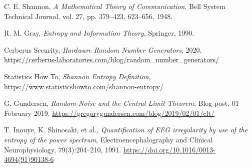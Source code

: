 \newpage
\begin{thebibliography}{99}  
    \raggedright

C. E. Shannon,
\textit{A Mathematical Theory of Communication},
Bell System Technical Journal,
vol. 27, pp. 379--423, 623--656, 1948.

R. M. Gray,
\textit{Entropy and Information Theory},
Springer, 1990.

Cerberus Security,
\textit{Hardware Random Number Generators},
2020.
\url{https://cerberus-laboratories.com/blog/random_number_generators/}

Statistics How To,
\textit{Shannon Entropy Definition},
\url{https://www.statisticshowto.com/shannon-entropy/}

G. Gundersen,
\textit{Random Noise and the Central Limit Theorem},
Blog post, 01 February 2019.
\url{https://gregorygundersen.com/blog/2019/02/01/clt/}


T. Inouye, K. Shinosaki, et al.,
\textit{Quantification of EEG irregularity by use of the entropy of the power spectrum},
Electroencephalography and Clinical Neurophysiology, 79(3):204–210, 1991.
\url{https://doi.org/10.1016/0013-4694(91)90138-6}

\end{thebibliography}



